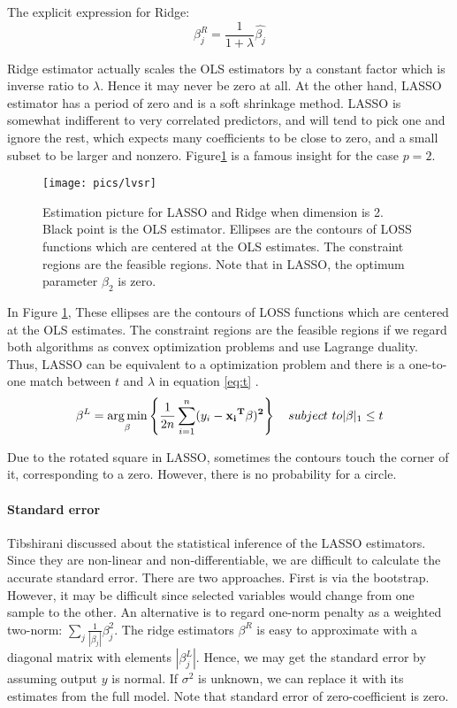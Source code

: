 \documentclass[]{article}
\begin{document}
The explicit expression for Ridge:
\begin{equation} 
{\beta_j^{R}}=\frac{1}{1+\lambda}\hat{\beta_j}
\end{equation}


Ridge estimator actually scales the OLS estimators by a constant factor which is inverse ratio to $ \lambda $. Hence it may never be zero at all. At the other hand, LASSO estimator has a period of zero and is a soft shrinkage method. LASSO is somewhat indifferent to very correlated predictors, and will tend to pick one and ignore the rest, which expects many coefficients to be close to zero, and a small subset to be larger and nonzero. Figure\ref{fig=lvsr} is a famous insight for the case $ p=2 $.

\begin{figure}[H]
	\centering
	\texttt{[image: pics/lvsr]}
	\caption{Estimation picture for LASSO and Ridge when dimension is 2. Black point is the OLS estimator. Ellipses are the contours of LOSS functions which are centered at the OLS estimates. The constraint regions are the feasible regions. Note that in LASSO, the optimum parameter $ \beta_2 $ is zero.\label{fig=lvsr}}
	
\end{figure}

In Figure \ref{fig=lvsr}, These ellipses are the contours of LOSS functions which are centered at the OLS estimates. The constraint regions are the feasible regions if we regard both algorithms as convex optimization problems and use Lagrange duality\cite{hager1976lagrange}. Thus, LASSO can be equivalent to a optimization problem and there is a one-to-one match between $ t $ and $\lambda$ in equation \ref{eq:t} .
\begin{equation}
\beta^L =\mathop{\arg\min}_{\beta} \left\{\frac{1}{2n}\sum_{i=1}^n (y_i-\bf{x_i}^T\beta)^2 \right\} \quad subject \ to |\beta|_1 \leq t\label{eq:t} 
\end{equation}

Due to the rotated square in LASSO, sometimes the contours touch the corner of it, corresponding to a zero. However, there is no probability for a circle.

\paragraph{Standard error}
Tibshirani discussed about the statistical inference of the LASSO estimators. Since they are non-linear and non-differentiable, we are difficult to calculate the accurate standard error. There are two approaches. First is via the bootstrap. However, it may be difficult since selected variables would change from one sample to the other. An alternative is to regard one-norm penalty as a weighted two-norm: $ \sum_j \frac{1}{|\beta_j|}\beta_j^2 $. The ridge estimators $\beta^R$ is easy to approximate with a diagonal matrix with elements $|\beta_j^L|$. Hence, we may get the standard error by assuming output $y$ is normal. If $ \sigma^2 $ is unknown, we can replace it with its estimates from the full model. Note that standard error of zero-coefficient is zero.
\end{document}
